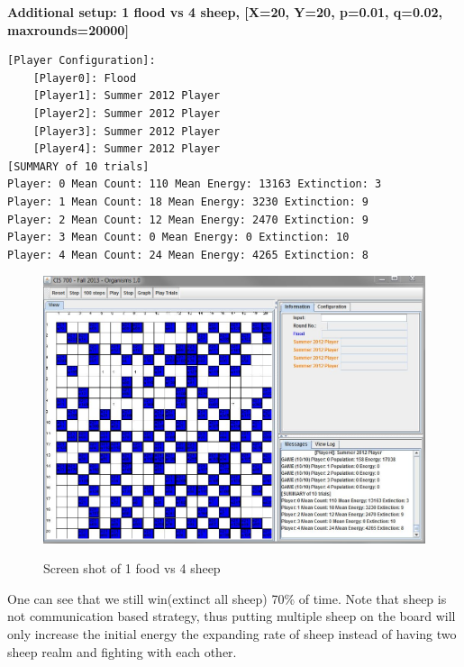 \textbf{Additional setup: 1 flood vs 4 sheep, [X=20, Y=20, p=0.01, q=0.02, maxrounds=20000]}
\begin{verbatim}
[Player Configuration]:
	[Player0]: Flood
	[Player1]: Summer 2012 Player
	[Player2]: Summer 2012 Player
	[Player3]: Summer 2012 Player
	[Player4]: Summer 2012 Player
[SUMMARY of 10 trials]
Player: 0 Mean Count: 110 Mean Energy: 13163 Extinction: 3
Player: 1 Mean Count: 18 Mean Energy: 3230 Extinction: 9
Player: 2 Mean Count: 12 Mean Energy: 2470 Extinction: 9
Player: 3 Mean Count: 0 Mean Energy: 0 Extinction: 10
Player: 4 Mean Count: 24 Mean Energy: 4265 Extinction: 8
\end{verbatim}

\begin{figure}[ht]
\centering
  \includegraphics[width=150mm]{figs/1v4.JPG}\\
  \caption{Screen shot of 1 food vs 4 sheep}\label{fig:1v4}
\end{figure}

One can see that we still win(extinct all sheep) 70\% of time.
Note that sheep is not communication based strategy, thus putting multiple 
sheep on the board will only increase the initial energy the expanding rate 
of sheep instead of having two sheep realm and fighting with each other.
